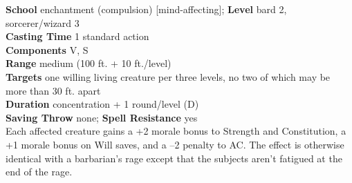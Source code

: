 \textbf{School} enchantment (compulsion) [mind-affecting]; \textbf{Level} bard 2, sorcerer/wizard 3\\
\textbf{Casting Time} 1 standard action\\
\textbf{Components} V, S\\
\textbf{Range }medium (100 ft. + 10 ft./level)\\
\textbf{Targets} one willing living creature per three levels, no two of which may be more than 30 ft. apart\\
\textbf{Duration} concentration + 1 round/level (D)\\
\textbf{Saving Throw} none; \textbf{Spell Resistance} yes\\
Each affected creature gains a +2 morale bonus to Strength and Constitution, a +1 morale bonus on Will saves, and a –2 penalty to AC. The effect is otherwise identical with a barbarian's rage except that the subjects aren't fatigued at the end of the rage.\\
